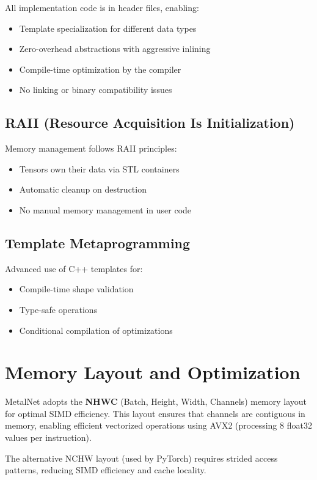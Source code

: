 \documentclass[12pt,oneside,a4paper]{report}
\begin{document}
All implementation code is in header files, enabling:
\begin{itemize}
    \item Template specialization for different data types
    \item Zero-overhead abstractions with aggressive inlining
    \item Compile-time optimization by the compiler
    \item No linking or binary compatibility issues
\end{itemize}

\subsection{RAII (Resource Acquisition Is Initialization)}

Memory management follows RAII principles:
\begin{itemize}
    \item Tensors own their data via STL containers
    \item Automatic cleanup on destruction
    \item No manual memory management in user code
\end{itemize}

\subsection{Template Metaprogramming}

Advanced use of C++ templates for:
\begin{itemize}
    \item Compile-time shape validation
    \item Type-safe operations
    \item Conditional compilation of optimizations
\end{itemize}

\section{Memory Layout and Optimization}

MetalNet adopts the \textbf{NHWC} (Batch, Height, Width, Channels) memory layout for optimal SIMD efficiency. This layout ensures that channels are contiguous in memory, enabling efficient vectorized operations using AVX2 (processing 8 float32 values per instruction).

The alternative NCHW layout (used by PyTorch) requires strided access patterns, reducing SIMD efficiency and cache locality.
\end{document}
